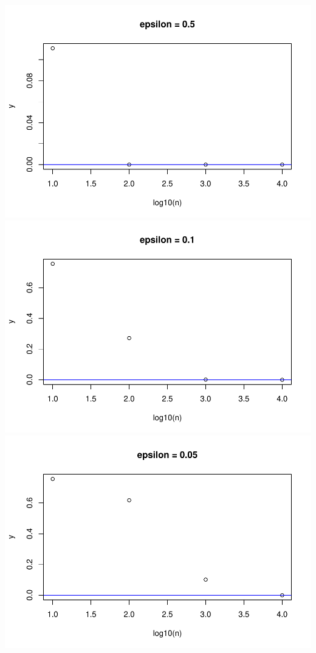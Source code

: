 \documentclass[
]{article}
\begin{document}
\includegraphics{stad80a1_files/figure-latex/unnamed-chunk-6-1.pdf}
\includegraphics{stad80a1_files/figure-latex/unnamed-chunk-7-1.pdf}
\includegraphics{stad80a1_files/figure-latex/unnamed-chunk-8-1.pdf}
\end{document}
